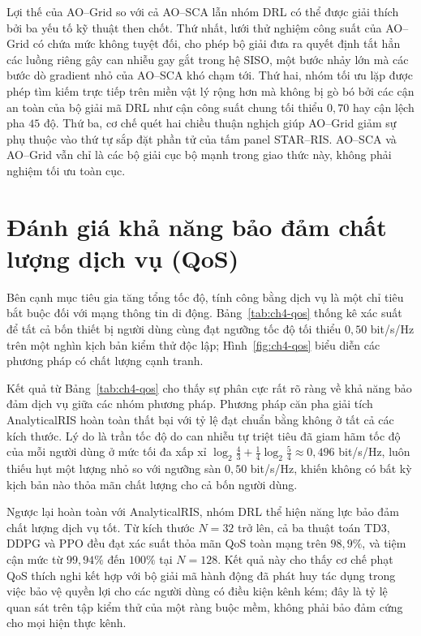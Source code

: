 Lợi thế của AO--Grid so với cả AO--SCA lẫn nhóm DRL có thể được giải thích bởi ba yếu tố kỹ thuật then chốt. Thứ
nhất, lưới thử nghiệm công suất của AO--Grid có chứa mức không tuyệt đối, cho phép bộ giải đưa ra quyết định tắt hẳn
các luồng riêng gây can nhiễu gay gắt trong hệ SISO, một bước nhảy lớn mà các bước dò gradient nhỏ của AO--SCA khó
chạm tới. Thứ hai, nhóm tối ưu lặp được phép tìm kiếm trực tiếp trên miền vật lý rộng hơn mà không bị gò bó bởi các
cận an toàn của bộ giải mã DRL như cận công suất chung tối thiểu $0,70$ hay cận lệch pha $45$ độ. Thứ ba, cơ chế
quét hai chiều thuận nghịch giúp AO--Grid giảm sự phụ thuộc vào thứ tự sắp đặt phần tử của tấm panel STAR--RIS.
AO--SCA và AO--Grid vẫn chỉ là các bộ giải cục bộ mạnh trong giao thức này, không phải nghiệm tối ưu toàn cục.

\section{Đánh giá khả năng bảo đảm chất lượng dịch vụ (QoS)}
\label{sec:danh-gia-qos}

Bên cạnh mục tiêu gia tăng tổng tốc độ, tính công bằng dịch vụ là một chỉ tiêu bắt buộc đối với mạng thông tin di
động. Bảng~\ref{tab:ch4-qos} thống kê xác suất để tất cả bốn thiết bị người dùng cùng đạt ngưỡng tốc độ tối thiểu
$0,50$ bit/s/Hz trên một nghìn kịch bản kiểm thử độc lập; Hình~\ref{fig:ch4-qos} biểu diễn các phương pháp có chất
lượng cạnh tranh.





Kết quả từ Bảng~\ref{tab:ch4-qos} cho thấy sự phân cực rất rõ ràng về khả năng bảo đảm dịch vụ giữa các nhóm phương
pháp. Phương pháp căn pha giải tích AnalyticalRIS hoàn toàn thất bại với tỷ lệ đạt chuẩn bằng không ở tất cả các
kích thước. Lý do là trần tốc độ do can nhiễu tự triệt tiêu đã giam hãm tốc độ của mỗi người dùng ở mức tối đa xấp
xỉ $\log_2\tfrac{4}{3} + \tfrac{1}{4}\log_2\tfrac{5}{4} \approx 0,496$ bit/s/Hz, luôn thiếu hụt một lượng nhỏ so
với ngưỡng sàn $0,50$ bit/s/Hz, khiến không có bất kỳ kịch bản nào thỏa mãn chất lượng cho cả bốn người dùng.

Ngược lại hoàn toàn với AnalyticalRIS, nhóm DRL thể hiện năng lực bảo đảm chất lượng dịch vụ tốt. Từ kích thước
$N = 32$ trở lên, cả ba thuật toán TD3, DDPG và PPO đều đạt xác suất thỏa mãn QoS toàn mạng trên $98,9\%$, và tiệm
cận mức từ $99,94\%$ đến $100\%$ tại $N = 128$. Kết quả này cho thấy cơ chế phạt QoS thích nghi kết hợp với bộ giải
mã hành động đã phát huy tác dụng trong việc bảo vệ quyền lợi cho các người dùng có điều kiện kênh kém; đây là tỷ
lệ quan sát trên tập kiểm thử của một ràng buộc mềm, không phải bảo đảm cứng cho mọi hiện thực kênh.

